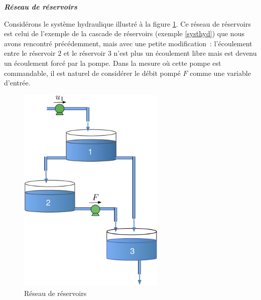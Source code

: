 \begin{exemple}{\bf \em Réseau de réservoirs}

Considérons le système hydraulique illustré à la figure \ref{Fig:reseauh}. Ce
réseau de réservoirs est celui de l'exemple de la cascade de
réservoirs (exemple \ref{systhyd}) que nous avons rencontré
précédemment, mais avec une petite modification~: l'écoulement entre le
réservoir $2$ et le réservoir $3$ n'est plus un écoulement libre mais est devenu
un écoulement forcé par la pompe. Dans la mesure où cette pompe est
commandable, il est naturel de considérer le débit pompé $F$ comme une variable
d'entrée. 

\begin{figure}[h] 
\begin{center}
\includegraphics[width=7cm]{images/reseauh}
\caption{Réseau de réservoirs}
\label{Fig:reseauh}
\end{center} 
\end{figure}


\end{exemple}
